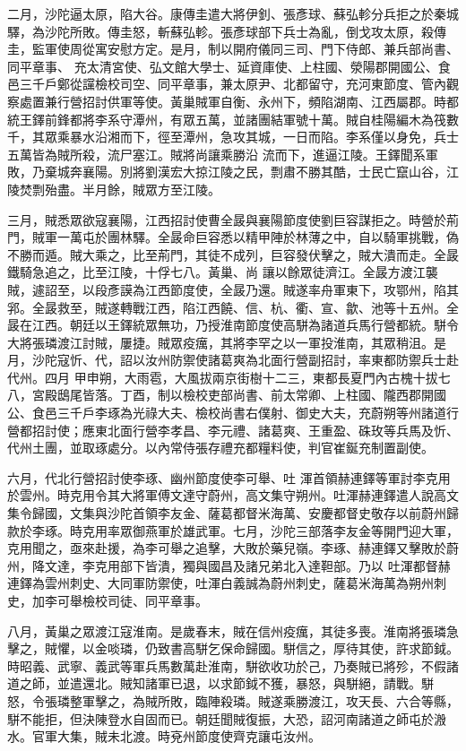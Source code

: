 \begin{pinyinscope}
 二月，沙陀逼太原，陷大谷。康傳圭遣大將伊釗、張彥球、蘇弘軫分兵拒之於秦城驛，為沙陀所敗。傳圭怒，斬蘇弘軫。張彥球部下兵士為亂，倒戈攻太原，殺傳圭，監軍使周從寓安慰方定。是月，制以開府儀同三司、門下侍郎、兼兵部尚書、同平章事、
 充太清宮使、弘文館大學士、延資庫使、上柱國、滎陽郡開國公、食邑三千戶鄭從讜檢校司空、同平章事，兼太原尹、北都留守，充河東節度、管內觀察處置兼行營招討供軍等使。黃巢賊軍自衡、永州下，頻陷湖南、江西屬郡。時都統王鐸前鋒都將李系守潭州，有眾五萬，並諸團結軍號十萬。賊自桂陽編木為筏數千，其眾乘暴水沿湘而下，徑至潭州，急攻其城，一日而陷。李系僅以身免，兵士五萬皆為賊所殺，流尸塞江。賊將尚讓乘勝沿
 流而下，進逼江陵。王鐸聞系軍敗，乃棄城奔襄陽。別將劉漢宏大掠江陵之民，剽肅不勝其酷，士民亡竄山谷，江陵焚剽殆盡。半月餘，賊眾方至江陵。



 三月，賊悉眾欲寇襄陽，江西招討使曹全晸與襄陽節度使劉巨容謀拒之。時營於荊門，賊軍一萬屯於團林驛。全晸命巨容悉以精甲陣於林薄之中，自以騎軍挑戰，偽不勝而遁。賊大乘之，比至荊門，其徒不成列，巨容發伏擊之，賊大潰而走。全晸鐵騎急追之，比至江陵，十俘七八。黃巢、尚
 讓以餘眾徒濟江。全晸方渡江襲賊，遽詔至，以段彥謨為江西節度使，全晸乃還。賊遂率舟軍東下，攻鄂州，陷其郛。全晸救至，賊遂轉戰江西，陷江西饒、信、杭、衢、宣、歙、池等十五州。全晸在江西。朝廷以王鐸統眾無功，乃授淮南節度使高駢為諸道兵馬行營都統。駢令大將張璘渡江討賊，屢捷。賊眾疫癘，其將李罕之以一軍投淮南，其眾稍沮。是月，沙陀寇忻、代，詔以汝州防禦使諸葛爽為北面行營副招討，率東都防禦兵士赴代州。四月
 甲申朔，大雨雹，大風拔兩京街樹十二三，東都長夏門內古槐十拔七八，宮殿鴟尾皆落。丁酉，制以檢校吏部尚書、前太常卿、上柱國、隴西郡開國公、食邑三千戶李琢為光祿大夫、檢校尚書右僕射、御史大夫，充蔚朔等州諸道行營都招討使；應東北面行營李孝昌、李元禮、諸葛爽、王重盈、硃玫等兵馬及忻、代州土團，並取琢處分。以內常侍張存禮充都糧料使，判官崔鋋充制置副使。



 六月，代北行營招討使李琢、幽州節度使李可舉、吐
 渾首領赫連鐸等軍討李克用於雲州。時克用令其大將軍傅文達守蔚州，高文集守朔州。吐渾赫連鐸遣人說高文集令歸國，文集與沙陀首領李友金、薩葛都督米海萬、安慶都督史敬存以前蔚州歸款於李琢。時克用率眾御燕軍於雄武軍。七月，沙陀三部落李友金等開門迎大軍，克用聞之，亟來赴援，為李可舉之追擊，大敗於藥兒嶺。李琢、赫連鐸又擊敗於蔚州，降文達，李克用部下皆潰，獨與國昌及諸兄弟北入達靼部。乃以
 吐渾都督赫連鐸為雲州刺史、大同軍防禦使，吐渾白義誠為蔚州刺史，薩葛米海萬為朔州刺史，加李可舉檢校司徒、同平章事。



 八月，黃巢之眾渡江寇淮南。是歲春末，賊在信州疫癘，其徒多喪。淮南將張璘急擊之，賊懼，以金啖璘，仍致書高駢乞保命歸國。駢信之，厚待其使，許求節鉞。時昭義、武寧、義武等軍兵馬數萬赴淮南，駢欲收功於己，乃奏賊已將殄，不假諸道之師，並遣還北。賊知諸軍已退，以求節鉞不獲，暴怒，與駢絕，請戰。駢
 怒，令張璘整軍擊之，為賊所敗，臨陣殺璘。賊遂乘勝渡江，攻天長、六合等縣，駢不能拒，但決陳登水自固而已。朝廷聞賊復振，大恐，詔河南諸道之師屯於溵水。官軍大集，賊未北渡。時兗州節度使齊克讓屯汝州。




\end{pinyinscope}
